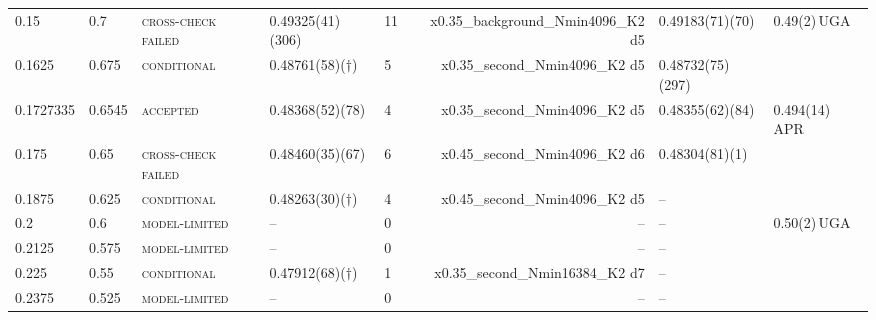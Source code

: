 \documentclass[10pt,a4paper]{article}
\newcommand{\lbl}[1]{{\mdseries\scshape #1}}
\begin{document}
\begin{table}
\begin{tabular}{@{}lllllrll@{}}
0.15 & 0.7 & \lbl{cross-check failed} & 0.49325(41)(306) & 11 & x0.35\_background\_Nmin4096\_K2 d5 & 0.49183(71)(70) & 0.49(2)\,UGA \\
0.1625 & 0.675 & \lbl{conditional} & 0.48761(58)($\dagger$) & 5 & x0.35\_second\_Nmin4096\_K2 d5 & 0.48732(75)(297) &  \\
0.1727335 & 0.6545 & \lbl{accepted} & 0.48368(52)(78) & 4 & x0.35\_second\_Nmin4096\_K2 d5 & 0.48355(62)(84) & 0.494(14)\,APR \\
0.175 & 0.65 & \lbl{cross-check failed} & 0.48460(35)(67) & 6 & x0.45\_second\_Nmin4096\_K2 d6 & 0.48304(81)(1) &  \\
0.1875 & 0.625 & \lbl{conditional} & 0.48263(30)($\dagger$) & 4 & x0.45\_second\_Nmin4096\_K2 d5 & -- &  \\
0.2 & 0.6 & \lbl{model-limited} & -- & 0 & -- & -- & 0.50(2)\,UGA \\
0.2125 & 0.575 & \lbl{model-limited} & -- & 0 & -- & -- &  \\
0.225 & 0.55 & \lbl{conditional} & 0.47912(68)($\dagger$) & 1 & x0.35\_second\_Nmin16384\_K2 d7 & -- &  \\
0.2375 & 0.525 & \lbl{model-limited} & -- & 0 & -- & -- &  \\
\bottomrule\end{tabular}
\end{table}
\end{document}
